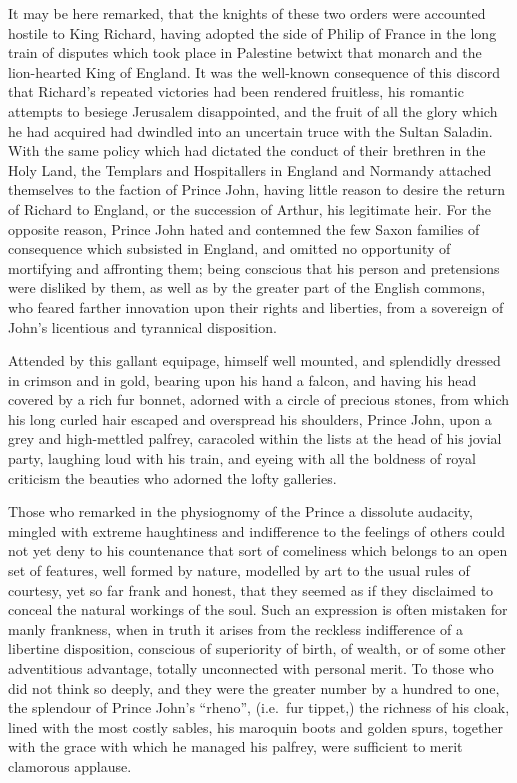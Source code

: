 It may be here remarked, that the knights of these two orders were
accounted hostile to King Richard, having adopted the side of Philip of
France in the long train of disputes which took place in Palestine
betwixt that monarch and the lion-hearted King of England. It was the
well-known consequence of this discord that Richard's repeated victories
had been rendered fruitless, his romantic attempts to besiege Jerusalem
disappointed, and the fruit of all the glory which he had acquired had
dwindled into an uncertain truce with the Sultan Saladin. With the same
policy which had dictated the conduct of their brethren in the Holy
Land, the Templars and Hospitallers in England and Normandy attached
themselves to the faction of Prince John, having little reason to desire
the return of Richard to England, or the succession of Arthur, his
legitimate heir. For the opposite reason, Prince John hated and
contemned the few Saxon families of consequence which subsisted in
England, and omitted no opportunity of mortifying and affronting them;
being conscious that his person and pretensions were disliked by them,
as well as by the greater part of the English commons, who feared
farther innovation upon their rights and liberties, from a sovereign of
John's licentious and tyrannical disposition.

Attended by this gallant equipage, himself well mounted, and splendidly
dressed in crimson and in gold, bearing upon his hand a falcon, and
having his head covered by a rich fur bonnet, adorned with a circle of
precious stones, from which his long curled hair escaped and overspread
his shoulders, Prince John, upon a grey and high-mettled palfrey,
caracoled within the lists at the head of his jovial party, laughing
loud with his train, and eyeing with all the boldness of royal criticism
the beauties who adorned the lofty galleries.

Those who remarked in the physiognomy of the Prince a dissolute
audacity, mingled with extreme haughtiness and indifference to the
feelings of others could not yet deny to his countenance that sort of
comeliness which belongs to an open set of features, well formed by
nature, modelled by art to the usual rules of courtesy, yet so far frank
and honest, that they seemed as if they disclaimed to conceal the
natural workings of the soul. Such an expression is often mistaken for
manly frankness, when in truth it arises from the reckless indifference
of a libertine disposition, conscious of superiority of birth, of
wealth, or of some other adventitious advantage, totally unconnected
with personal merit. To those who did not think so deeply, and they were
the greater number by a hundred to one, the splendour of Prince John's
``rheno'', (i.e.~fur tippet,) the richness of his cloak, lined with the
most costly sables, his maroquin boots and golden spurs, together with
the grace with which he managed his palfrey, were sufficient to merit
clamorous applause.

